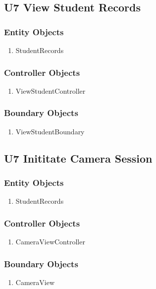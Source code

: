 \documentclass{scrreprt}
\begin{document}
\subsection{U7 View Student Records}
\subsubsection{Entity Objects}
\begin{enumerate}
  \item StudentRecords
\end{enumerate}
\subsubsection{Controller Objects}
\begin{enumerate}
  \item ViewStudentController
\end{enumerate}
\subsubsection{Boundary Objects}
\begin{enumerate}
  \item ViewStudentBoundary
\end{enumerate}
\subsection{U7 Inititate Camera Session}
\subsubsection{Entity Objects}
\begin{enumerate}
  \item StudentRecords
\end{enumerate}
\subsubsection{Controller Objects}
\begin{enumerate}
  \item CameraViewController
\end{enumerate}
\subsubsection{Boundary Objects}
\begin{enumerate}
  \item CameraView
\end{enumerate}
\end{document}
